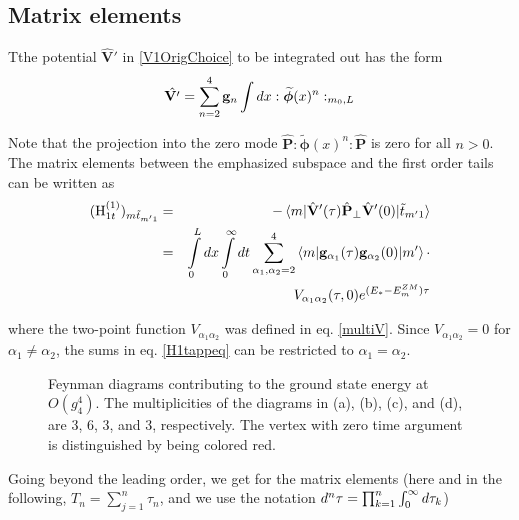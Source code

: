 \documentclass[twocolumn,secnumarabic,amssymb, nobibnotes, aps, prd]{revtex4-2}
\newcommand{\be}{\begin{equation}}
\newcommand{\ee}{\end{equation}}
\newcommand{\bea}{\begin{eqnarray}}
\newcommand{\eea}{\end{eqnarray}}
\begin{document}
\subsection{Matrix elements}
Tthe potential $\hat{\mathbf{V}}'$ in \eqref{V1OrigChoice} to be integrated out
has the form
\be
\hat{\mathbf{ V'}} = \sum_{n=2}^4\mathbf{g}_n\intop dx  :\widetilde{\boldsymbol{\phi}}(x)^n:_{m_0,L} 
\ee

Note that the projection into the zero mode $\hat{\mathbf P}:\widetilde{\boldsymbol{\phi}}(x)^n: \hat{\mathbf P}$ is zero for all $n>0$.
The matrix elements between the emphasized subspace and the first order tails can be written as
\bea
(\Hlt{1})_{m\tilde t_{m'1}}&=&-\braket{m|\hat{\mathbf{V}}'(\tau)\hat{\mathbf{P}}_\perp\hat{\mathbf{V}}'(0)|\tilde t_{m'1}}\nonumber\\
&=&\intop_0^Ldx\intop_0^{\infty}dt\sum_{\alpha_1,\alpha_2=2}^4\braket{m|\mathbf{g}_{\alpha_1}(\tau)\mathbf{g}_{\alpha_2}(0)|m^\prime}\cdot\nonumber\\
&&V_{\alpha_1\alpha_2}(\tau,0)e^{(E_*-E_m^{ZM})\tau}\label{H1tappeq}
\eea

where the two-point function $V_{\alpha_1\alpha_2}$ was defined in eq. \eqref{multiV}.
Since $V_{\alpha_1\alpha_2}=0$ for $\alpha_1\neq \alpha_2$, the sums in eq. \eqref{H1tappeq} can be restricted to $\alpha_1=\alpha_2$.  


\begin{figure*}[t]
\centering
{} 
    \caption{Feynman diagrams contributing to the ground state energy at $O(g_4^4)$.  The multiplicities of the diagrams in (a), (b), (c), and (d), are $3$, $6$, $3$, and $3$, respectively. The vertex with zero time argument is distinguished by being colored red.} 
    \label{FigGSFeyns2}
\end{figure*}
Going beyond the leading order, we get for the matrix elements (here and in the following, $T_n=\sum_{j=1}^n \tau_n$, and we use the notation $d^n\tau=\prod_{k=1}^{n} \intop_{0}^{\infty} d\tau_k$)
\end{document}
